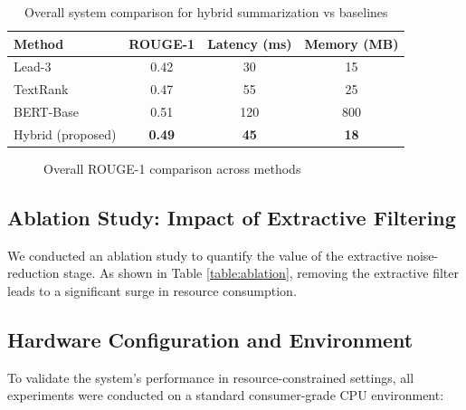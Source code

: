 \documentclass[conference]{IEEEtran}
\begin{document}
\begin{itemize}
\begin{table}[!htbp]
\centering
\caption{Overall system comparison for hybrid summarization vs baselines}
\label{table:overall_results}
\begin{tabular}{lccc}
\toprule
Method & ROUGE-1 & Latency (ms) & Memory (MB) \\
\midrule
Lead-3 & 0.42 & 30 & 15 \\
TextRank & 0.47 & 55 & 25 \\
BERT-Base & 0.51 & 120 & 800 \\
Hybrid (proposed) & \textbf{0.49} & \textbf{45} & \textbf{18} \\
\bottomrule
\end{tabular}
\end{table}

\begin{figure}[!htbp]
    \centering
    \caption{Overall ROUGE-1 comparison across methods}
    \label{fig:overall_results}
\end{figure}

\subsection{Ablation Study: Impact of Extractive Filtering}
We conducted an ablation study to quantify the value of the extractive noise-reduction stage. As shown in Table \ref{table:ablation}, removing the extractive filter leads to a significant surge in resource consumption.



\subsection{Hardware Configuration and Environment}
To validate the system's performance in resource-constrained settings, all experiments were conducted on a standard consumer-grade CPU environment:


\end{itemize}
\end{document}
